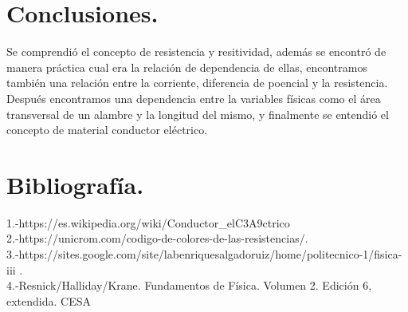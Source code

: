 \documentclass[11pt,a4paper]{article}
\begin{document}
\section{Conclusiones.}
Se comprendi\'{o} el concepto de resistencia y resitividad, adem\'{a}s se encontr\'{o} de manera pr\'{a}ctica cual era la relaci\'{o}n de dependencia de ellas, encontramos tambi\'{e}n una relaci\'{o}n entre la corriente, diferencia de poencial y la resistencia. Despu\'{e}s encontramos una dependencia entre la variables f\'{i}sicas como el \'{a}rea transversal de un alambre y la longitud del mismo, y finalmente se entendi\'{o} el concepto de material conductor el\'{e}ctrico. 
 \section{Bibliograf\'{i}a.}
1.-https://es.wikipedia.org/wiki/Conductor_elC3A9ctrico\\
2.-https://unicrom.com/codigo-de-colores-de-las-resistencias/.\\
3.-https://sites.google.com/site/labenriquesalgadoruiz/home/politecnico-1/fisica-iii .\\
4.-Resnick/Halliday/Krane. Fundamentos de F\'{i}sica. Volumen 2. Edici\'{o}n 6, extendida. CESA\\

\end{document}
